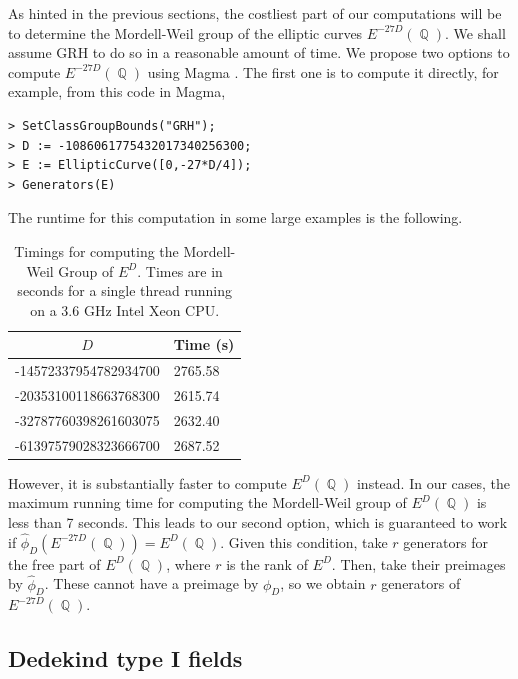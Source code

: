 \documentclass[oneside]{amsart}
\DeclareMathOperator{\QQ}{\mathbb{Q}}
\theoremstyle{definition}
\begin{document}
As hinted in the previous sections, the costliest part of our computations will be to determine the Mordell-Weil group of the elliptic curves $E^{-27D}(\QQ)$. We shall assume GRH to do so in a reasonable amount of time. We propose two options to compute $E^{-27D}(\QQ)$ using Magma \cite{magma}. The first one is to compute it directly, for example, from this code in Magma,

\begin{verbatim}
> SetClassGroupBounds("GRH");
> D := -1086061775432017340256300;
> E := EllipticCurve([0,-27*D/4]);
> Generators(E)
\end{verbatim}

The runtime for this computation in some large examples is the following.

\begin{table}[h]
\begin{tabular}{|l|l|}
\hline
\multicolumn{1}{|c|}{$D$} & \multicolumn{1}{c|}{Time (s)} \\ \hline
-14572337954782934700     & 2765.58                       \\ \hline
-20353100118663768300     & 2615.74                       \\ \hline
-32787760398261603075     & 2632.40                       \\ \hline
-61397579028323666700     & 2687.52                       \\ \hline
\end{tabular}
\caption{Timings for computing the Mordell-Weil Group of $E^D$. Times are in seconds for a single thread running on a 3.6 GHz Intel Xeon CPU.}
\end{table}

However, it is substantially faster to compute $E^D(\QQ)$ instead. In our cases, the maximum running time for computing the Mordell-Weil group of $E^D(\QQ)$ is less than 7 seconds. This leads to our second option, which is guaranteed to work if $\hat{\phi}_D(E^{-27D}(\QQ)) = E^D(\QQ)$. Given this condition, take $r$ generators for the free part of $E^D(\QQ)$, where $r$ is the rank of $E^D$. Then, take their preimages by $\hat{\phi}_D$. These cannot have a preimage by $\phi_D$, so we obtain $r$ generators of $E^{-27D}(\QQ)$. 

\subsection{Dedekind type I fields}
\end{document}
